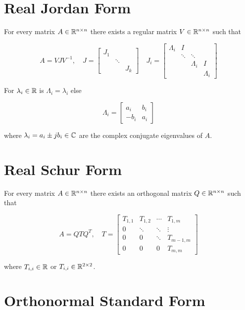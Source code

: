 \section{Real Jordan Form}

For every matrix \(A \in \mathbb{R}^{n \times n}\) there exists a regular matrix \(V \in \mathbb{R}^{n \times n}\) such that 

\[
    A = V J V^{-1}, \quad
    J = 
    \begin{bmatrix}
        J_1 & & \\ 
        & \ddots & \\ 
        & & J_k
    \end{bmatrix}
    \quad 
    J_i = 
    \begin{bmatrix}
        \Lambda_i & I & & \\ 
        & \ddots & \ddots & \\
        & & \Lambda_i & I \\
        & & & \Lambda_i
    \end{bmatrix}
\]

For \(\lambda_i \in \mathbb{R}\) is \(\Lambda_i = \lambda_i\) else 

\[
    \Lambda_i =
    \begin{bmatrix}
        a_i & b_i \\
        -b_i & a_i
    \end{bmatrix}
\]

where \(\lambda_i = a_i \pm jb_i \in \mathbb{C}\) are the complex conjugate eigenvalues of \(A\).

\section{Real Schur Form}

For every matrix \(A \in \mathbb{R}^{n \times n}\) there exists an orthogonal matrix \(Q \in \mathbb{R}^{n \times n}\) such that

\[
    A = Q T Q^T, \quad
    T = 
    \begin{bmatrix}
        T_{1,1} & T_{1,2}&  \cdots & T_{1,m} \\ 
        0 & \ddots & \ddots & \vdots \\
        0 & 0 & \ddots & T_{m-1,m} \\
        0 & 0 & 0 & T_{m , m}
    \end{bmatrix}
\]

where \(T_{i,i} \in \mathbb{R}\) or \(T_{i,i} \in \mathbb{R}^{2 \times 2}\).

\section{Orthonormal Standard Form}

